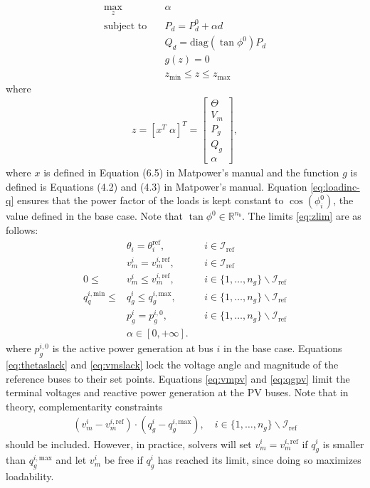 \documentclass[12pt,a4]{article}
\newcommand*{\field}[1]{\mathbb{#1}}
\newcommand*{\R}{\field{R}} %
\newcommand*{\matpower}{{\sc Matpower}}
\begin{document}
\begin{subequations}\label{eq:maxll}
\begin{align}
  \max_{z} \quad & \alpha \label{eq:maxll-obj} \\
  \text{subject to} \quad & P_d = P_d^0 + \alpha d \label{eq:loadinc}\\
   & Q_d = \text{diag}(\tan \phi^0) P_d \label{eq:loadinc-q}\\
   & g(z) = 0 \\
   & z_\text{min} \leq z \leq z_\text{max} \label{eq:zlim}
\end{align}  
\end{subequations}
where
\begin{align}
  \label{eq:z}
  z = [x^T \; \alpha]^T =  \begin{bmatrix}
    \Theta \\
    V_m \\
    P_g \\
    Q_g \\
    \alpha
  \end{bmatrix},
\end{align}
where $x$ is defined in Equation (6.5) in \matpower{}'s manual and the function $g$ is defined is Equations (4.2) and (4.3) in \matpower{}'s manual.
Equation \eqref{eq:loadinc-q} ensures that the power factor of the loads is kept constant to $\cos(\phi_i^0)$, the value defined in the base case.
Note that $\tan \phi^0 \in \R^{n_b}$.
The limits \eqref{eq:zlim} are as follows:
\begin{align}
  & \theta_i = \theta_i^\text{ref}, && i \in \mathcal{I}_\text{ref} \label{eq:thetaslack} \\
  & v_m^{i} = v_m^{i,\text{ref}}, && i \in \mathcal{I}_\text{ref} \label{eq:vmslack} \\
  0 \leq & v_m^{i} \leq v_m^{i,\text{ref}}, && i \in \{1,\ldots,n_g\} \backslash \mathcal{I}_\text{ref} \label{eq:vmpv} \\
  q_q^{i,\text{min}} \leq & q_g^i \leq q_g^{i,\text{max}}, && i \in \{1,\ldots,n_g\} \backslash \mathcal{I}_\text{ref} \label{eq:qgpv}\\
  & p_g^i = p_g^{i,0}, && i \in \{1,\ldots,n_g\} \backslash \mathcal{I}_\text{ref} \\
  & \alpha \in [0,+\infty].
\end{align}
where $p_g^{i,0}$ is the active power generation at bus $i$ in the base case.
Equations \eqref{eq:thetaslack} and \eqref{eq:vmslack} lock the voltage angle and magnitude of the reference buses to their set points.
Equations \eqref{eq:vmpv} and \eqref{eq:qgpv} limit the terminal voltages and reactive power generation at the PV buses. 
Note that in theory, complementarity constraints
\begin{align}
  \label{eq:comp-constr}
  (v_m^i-v_m^{i,\text{ref}})\cdot(q_g^i-q_g^{i,\text{max}}), \quad i \in \{1,\ldots,n_g\} \backslash \mathcal{I}_\text{ref}
\end{align}
should be included. 
However, in practice, solvers will set $v_m^i = v_m^{i,\text{ref}}$ if $q_g^i$ is smaller than $q_g^{i,\text{max}}$ and let $v_m^i$ be free if $q_g^i$ has reached its limit, since doing so maximizes loadability.
\end{document}
